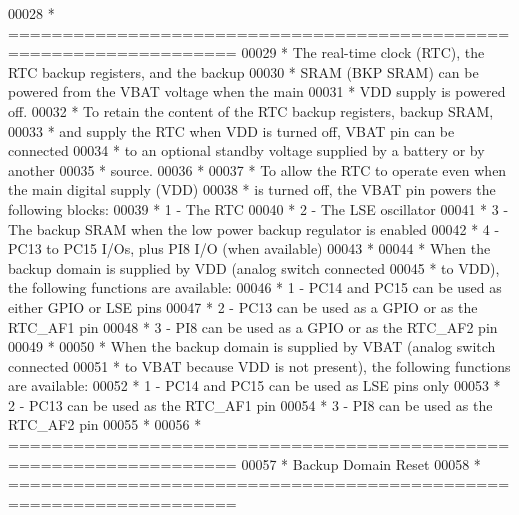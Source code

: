 \begin{DoxyCode}
00028 \textcolor{comment}{  *          ===================================================================}
00029 \textcolor{comment}{  *          The real-time clock (RTC), the RTC backup registers, and the backup }
00030 \textcolor{comment}{  *          SRAM (BKP SRAM) can be powered from the VBAT voltage when the main }
00031 \textcolor{comment}{  *          VDD supply is powered off.}
00032 \textcolor{comment}{  *          To retain the content of the RTC backup registers, backup SRAM, }
00033 \textcolor{comment}{  *          and supply the RTC when VDD is turned off, VBAT pin can be connected }
00034 \textcolor{comment}{  *          to an optional standby voltage supplied by a battery or by another }
00035 \textcolor{comment}{  *          source.}
00036 \textcolor{comment}{  *}
00037 \textcolor{comment}{  *          To allow the RTC to operate even when the main digital supply (VDD) }
00038 \textcolor{comment}{  *          is turned off, the VBAT pin powers the following blocks:}
00039 \textcolor{comment}{  *            1 - The RTC}
00040 \textcolor{comment}{  *            2 - The LSE oscillator}
00041 \textcolor{comment}{  *            3 - The backup SRAM when the low power backup regulator is enabled}
00042 \textcolor{comment}{  *            4 - PC13 to PC15 I/Os, plus PI8 I/O (when available)}
00043 \textcolor{comment}{  *}
00044 \textcolor{comment}{  *          When the backup domain is supplied by VDD (analog switch connected }
00045 \textcolor{comment}{  *          to VDD), the following functions are available:}
00046 \textcolor{comment}{  *            1 - PC14 and PC15 can be used as either GPIO or LSE pins}
00047 \textcolor{comment}{  *            2 - PC13 can be used as a GPIO or as the RTC\_AF1 pin}
00048 \textcolor{comment}{  *            3 - PI8 can be used as a GPIO or as the RTC\_AF2 pin}
00049 \textcolor{comment}{  *}
00050 \textcolor{comment}{  *          When the backup domain is supplied by VBAT (analog switch connected }
00051 \textcolor{comment}{  *          to VBAT because VDD is not present), the following functions are available:}
00052 \textcolor{comment}{  *            1 - PC14 and PC15 can be used as LSE pins only}
00053 \textcolor{comment}{  *            2 - PC13 can be used as the RTC\_AF1 pin }
00054 \textcolor{comment}{  *            3 - PI8 can be used as the RTC\_AF2 pin}
00055 \textcolor{comment}{  *}
00056 \textcolor{comment}{  *          ===================================================================}
00057 \textcolor{comment}{  *                                    Backup Domain Reset}
00058 \textcolor{comment}{  *          ===================================================================}

\end{DoxyCode}

